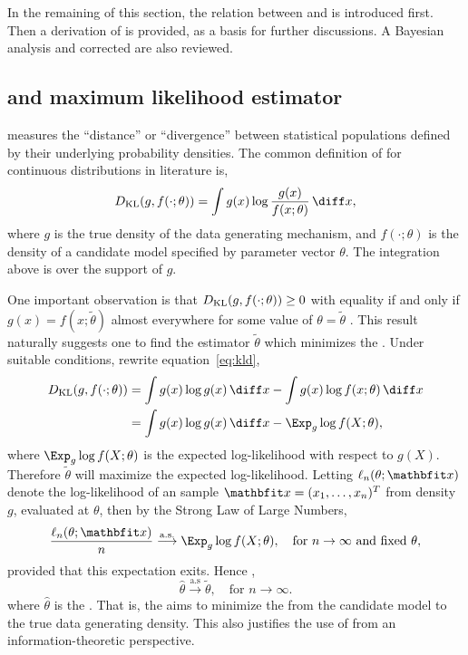 In the remaining of this section, the relation between \kl and \mle is
introduced first. Then a derivation of \aic is provided, as a basis for
further discussions. A Bayesian analysis and corrected \aic are also reviewed.

\subsection{\protect\kl and maximum likelihood estimator}
\label{sub:kl and maximum likelihood estimator}

\kl measures the ``distance'' or ``divergence'' between statistical
populations defined by their underlying probability densities. The common
definition of \kl for continuous distributions in literature is,
\begin{equation}
  \dkl(g, f(\cdot;\theta)) = \int g(x)\log\frac{g(x)}{f(x;\theta)}\intd x,
  \label{eq:kld}
\end{equation}
where $g$ is the true density of the data generating mechanism, and
$f(\cdot;\theta)$ is the density of a candidate model specified by parameter
vector $\theta$. The integration above is over the support of $g$.

One important observation is that $D_{\mathrm{KL}}(g,f(\cdot;\theta))\ge0$ with equality if
and only if $g(x) = f(x;\tilde\theta)$ almost everywhere for some value of $\theta =
\tilde\theta$ \parencite{Kullback:1951va}. This result naturally suggests one to find
the estimator $\tilde\theta$ which minimizes the \kl. Under suitable conditions,
rewrite equation~\eqref{eq:kld},
\begin{align}
  \dkl(g,f(\cdot;\theta))
  & = \int g(x)\log g(x)\intd x - \int g(x)\log f(x;\theta)\intd x \notag\\
  & = \int g(x)\log g(x)\intd x - \Exp_g \log f(X;\theta),
  \label{eq:kl exp ll}
\end{align}
where $\Exp_g\log f(X;\theta)$ is the expected log-likelihood with respect to
$g(X)$. Therefore $\tilde\theta$ will maximize the expected log-likelihood. Letting
$\ell_n(\theta;\bfx)$ denote the log-likelihood of an \iid sample $\bfx =
(x_1,\dots,x_n)^T$ from density $g$, evaluated at $\theta$, then by the Strong
Law of Large Numbers,
\begin{equation}
  \frac{\ell_n(\theta;\bfx)}{n}
  \overset{\mathrm{a.s.}}{\longrightarrow}
  \Exp_g\log f(X;\theta), \quad\text{for } n\to\infty\text{ and fixed }\theta,
  \label{eq:kl consistency}
\end{equation}
provided that this expectation exits. Hence \parencite[see][for
details]{Kullback:1951va},
\begin{equation}
  \hat\theta \overset{\mathrm{a.s}}{\longrightarrow} \tilde\theta,
  \quad\text{for } n\to\infty.
\end{equation}
where $\hat\theta$ is the \mle. That is, the \mle aims to minimize the \kl from the
candidate model to the true data generating density. This also justifies the
use of \mle from an information-theoretic perspective.

